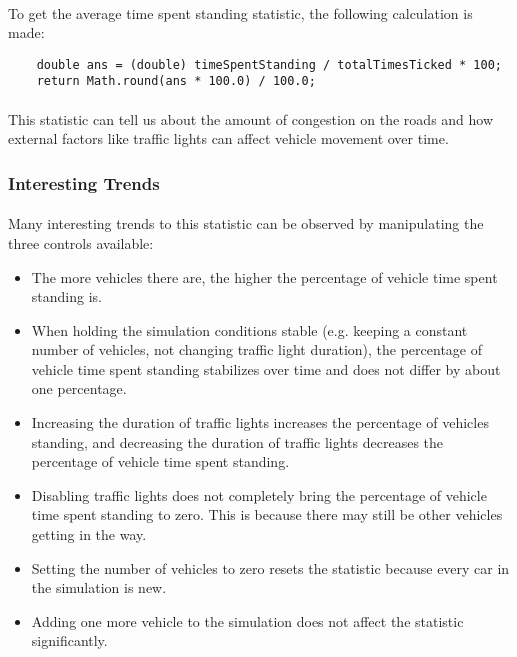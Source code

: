\documentclass[a4paper,11pt,titlepage]{article}
\begin{document}
\paragraph{}
To get the average time spent standing statistic, the following calculation is made:
\begin{lstlisting}
	double ans = (double) timeSpentStanding / totalTimesTicked * 100;
	return Math.round(ans * 100.0) / 100.0;
\end{lstlisting}
\paragraph{}
This statistic can tell us about the amount of congestion on the roads and how external factors like traffic lights can affect vehicle movement over time.

\subsubsection{Interesting Trends}
\paragraph{}
Many interesting trends to this statistic can be observed by manipulating the three controls available:
\begin{itemize}\itemsep1pt \parskip0pt 
\item The more vehicles there are, the higher the percentage of vehicle time spent standing is.
\item When holding the simulation conditions stable (e.g. keeping a constant number of vehicles, not changing traffic light duration), the percentage of vehicle time spent standing stabilizes over time and does not differ by about one percentage.
\item Increasing the duration of traffic lights increases the percentage of vehicles standing, and decreasing the duration of traffic lights decreases the percentage of vehicle time spent standing.
\item Disabling traffic lights does not completely bring the percentage of vehicle time spent standing to zero. This is because there may still be other vehicles getting in the way.
\item Setting the number of vehicles to zero resets the statistic because every car in the simulation is new.
\item Adding one more vehicle to the simulation does not affect the statistic significantly.
\end{itemize}
\end{document}
